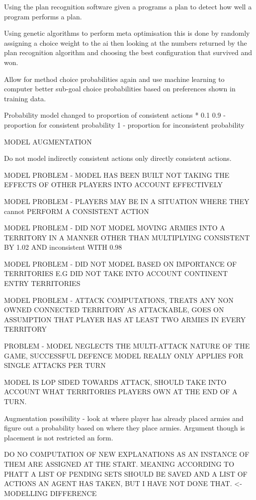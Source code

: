 \documentclass[parskip]{cs4rep}
\begin{document}
Using the plan recognition software given a programs a plan to detect how well a program performs a plan. 

Using genetic algorithms to perform meta optimisation this is done by randomly assigning a choice weight to the ai then looking at the numbers returned by the plan recognition algorithm and choosing the best configuration that survived and won.

Allow for method choice probabilities again and use machine learning to computer better sub-goal choice probabilities based on preferences shown in training data.

Probability model changed to proportion of consistent actions * 0.1 
0.9 - proportion for consistent probability
1 - proportion for inconsistent probability

MODEL AUGMENTATION

Do not model indirectly consistent actions only directly consistent actions.

MODEL PROBLEM - MODEL HAS BEEN BUILT NOT TAKING THE EFFECTS OF OTHER PLAYERS INTO ACCOUNT EFFECTIVELY

MODEL PROBLEM - PLAYERS MAY BE IN A SITUATION WHERE THEY cannot PERFORM A CONSISTENT ACTION

MODEL PROBLEM - DID NOT MODEL MOVING ARMIES INTO A TERRITORY IN A MANNER OTHER THAN MULTIPLYING CONSISTENT BY 1.02 AND inconsistent WITH 0.98

MODEL PROBLEM - DID NOT MODEL BASED ON IMPORTANCE OF TERRITORIES E.G DID NOT TAKE INTO ACCOUNT CONTINENT ENTRY TERRITORIES

MODEL PROBLEM - ATTACK COMPUTATIONS, TREATS ANY NON OWNED CONNECTED TERRITORY AS ATTACKABLE, GOES ON ASSUMPTION THAT PLAYER HAS AT LEAST TWO ARMIES IN EVERY TERRITORY

PROBLEM - MODEL NEGLECTS THE MULTI-ATTACK NATURE OF THE GAME, SUCCESSFUL DEFENCE MODEL REALLY ONLY APPLIES FOR SINGLE ATTACKS PER TURN

MODEL IS LOP SIDED TOWARDS ATTACK, SHOULD TAKE INTO ACCOUNT WHAT TERRITORIES PLAYERS OWN AT THE END OF A TURN.

Augmentation possibility - look at where player has already placed armies and figure out a probability based on where they place armies. Argument though is placement is not restricted an form.

DO NO COMPUTATION OF NEW EXPLANATIONS AS AN INSTANCE OF THEM ARE ASSIGNED AT THE START. MEANING ACCORDING TO PHATT A LIST OF PENDING SETS SHOULD BE SAVED AND A LIST OF ACTIONS AN AGENT HAS TAKEN, BUT I HAVE NOT DONE THAT. <- MODELLING DIFFERENCE
\end{document}

